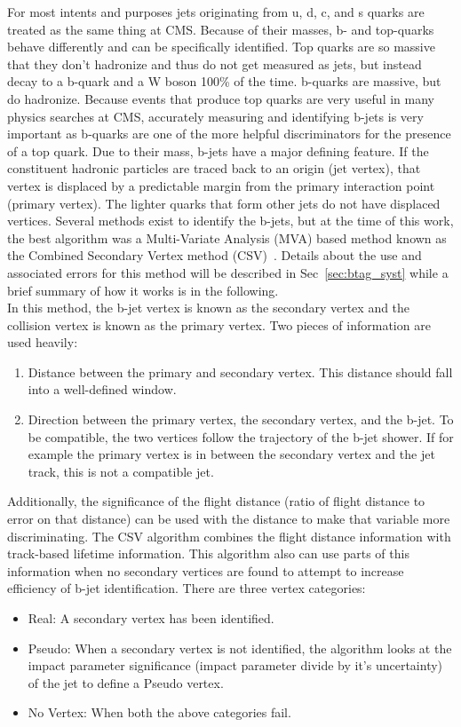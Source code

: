 	For most intents and purposes jets originating from u, d, c, and s quarks are treated as the same thing at CMS. Because of their masses, b- and top-quarks behave differently and can be specifically identified. Top quarks are so massive that they don't hadronize and thus do not get measured as jets, but instead decay to a b-quark and a W boson 100\% of the time. b-quarks are massive, but do hadronize. Because events that produce top quarks are very useful in many physics searches at CMS, accurately measuring and identifying b-jets is very important as b-quarks are one of the more helpful discriminators for the presence of a top quark. Due to their mass, b-jets have a major defining feature. If the constituent hadronic particles are traced back to an origin (jet vertex), that vertex is displaced by a predictable margin from the primary interaction point (primary vertex). The lighter quarks that form other jets do not have displaced vertices. Several methods exist to identify the b-jets, but at the time of this work, the best algorithm was a Multi-Variate Analysis (MVA) based method known as the Combined Secondary Vertex method (CSV)~\cite{btagging}. Details about the use and associated errors for this method will be described in Sec~\ref{sec:btag_syst} while a brief summary of how it works is in the following.\\
	
	In this method, the b-jet vertex is known as the secondary vertex and the collision vertex is known as the primary vertex. Two pieces of information are used heavily:
	\begin{enumerate}
	\item Distance between the primary and secondary vertex. This distance should fall into a well-defined window.
	\item Direction between the primary vertex, the secondary vertex, and the b-jet. To be compatible, the two vertices follow the trajectory of the b-jet shower. If for example the primary vertex is in between the secondary vertex and the jet track, this is not a compatible jet.
	\end{enumerate}
	
	Additionally, the significance of the flight distance (ratio of flight distance to error on that distance) can be used with the distance to make that variable more discriminating. The CSV algorithm combines the flight distance information with track-based lifetime information. This algorithm also can use parts of this information when no secondary vertices are found to attempt to increase efficiency of b-jet identification. There are three vertex categories:
	\begin{itemize}
	\item Real: A secondary vertex has been identified.
	\item Pseudo: When a secondary vertex is not identified, the algorithm looks at the impact parameter significance (impact parameter divide by it's uncertainty) of the jet to define a Pseudo vertex.
	\item No Vertex: When both the above categories fail.
	\end{itemize}
	
